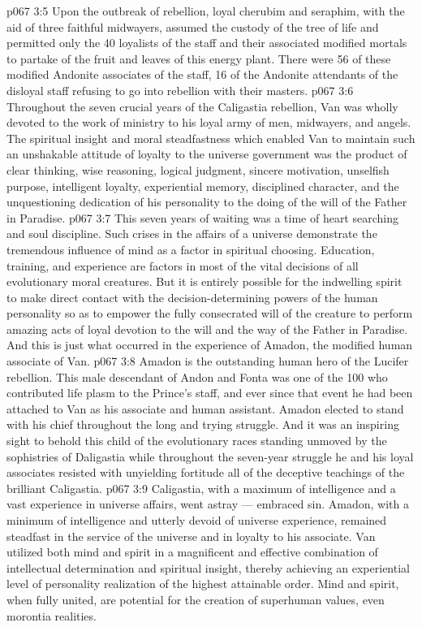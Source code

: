 \vs p067 3:5 Upon the outbreak of rebellion, loyal cherubim and seraphim, with the aid of three faithful midwayers, assumed the custody of the tree of life and permitted only the 40 loyalists of the staff and their associated modified mortals to partake of the fruit and leaves of this energy plant. There were 56 of these modified Andonite associates of the staff, 16 of the Andonite attendants of the disloyal staff refusing to go into rebellion with their masters.
\vs p067 3:6 \pc Throughout the seven crucial years of the Caligastia rebellion, Van was wholly devoted to the work of ministry to his loyal army of men, midwayers, and angels. The spiritual insight and moral steadfastness which enabled Van to maintain such an unshakable attitude of loyalty to the universe government was the product of clear thinking, wise reasoning, logical judgment, sincere motivation, unselfish purpose, intelligent loyalty, experiential memory, disciplined character, and the unquestioning dedication of his personality to the doing of the will of the Father in Paradise.
\vs p067 3:7 This seven years of waiting was a time of heart searching and soul discipline. Such crises in the affairs of a universe demonstrate the tremendous influence of mind as a factor in spiritual choosing. Education, training, and experience are factors in most of the vital decisions of all evolutionary moral creatures. But it is entirely possible for the indwelling spirit to make direct contact with the decision\hyp{}determining powers of the human personality so as to empower the fully consecrated will of the creature to perform amazing acts of loyal devotion to the will and the way of the Father in Paradise. And this is just what occurred in the experience of Amadon, the modified human associate of Van.
\vs p067 3:8 Amadon is the outstanding human hero of the Lucifer rebellion. This male descendant of Andon and Fonta was one of the 100 who contributed life plasm to the Prince’s staff, and ever since that event he had been attached to Van as his associate and human assistant. Amadon elected to stand with his chief throughout the long and trying struggle. And it was an inspiring sight to behold this child of the evolutionary races standing unmoved by the sophistries of Daligastia while throughout the seven\hyp{}year struggle he and his loyal associates resisted with unyielding fortitude all of the deceptive teachings of the brilliant Caligastia.
\vs p067 3:9 Caligastia, with a maximum of intelligence and a vast experience in universe affairs, went astray --- embraced sin. Amadon, with a minimum of intelligence and utterly devoid of universe experience, remained steadfast in the service of the universe and in loyalty to his associate. Van utilized both mind and spirit in a magnificent and effective combination of intellectual determination and spiritual insight, thereby achieving an experiential level of personality realization of the highest attainable order. Mind and spirit, when fully united, are potential for the creation of superhuman values, even morontia realities.
